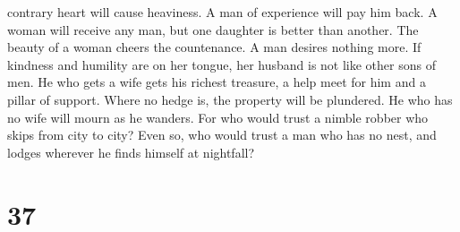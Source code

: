 contrary heart will cause heaviness. A man of experience will pay him
back.  A woman will receive any man, but one daughter is
better than another.  The beauty of a woman cheers the
countenance. A man desires nothing more.  If kindness and
humility are on her tongue, her husband is not like other sons of men.
 He who gets a wife gets his richest treasure, a help
meet for him and a pillar of support.  Where no hedge is,
the property will be plundered. He who has no wife will mourn as he
wanders.  For who would trust a nimble robber who skips
from city to city? Even so, who would trust a man who has no nest, and
lodges wherever he finds himself at nightfall?

\hypertarget{section-30}{%
\section{37}\label{section-30}}

